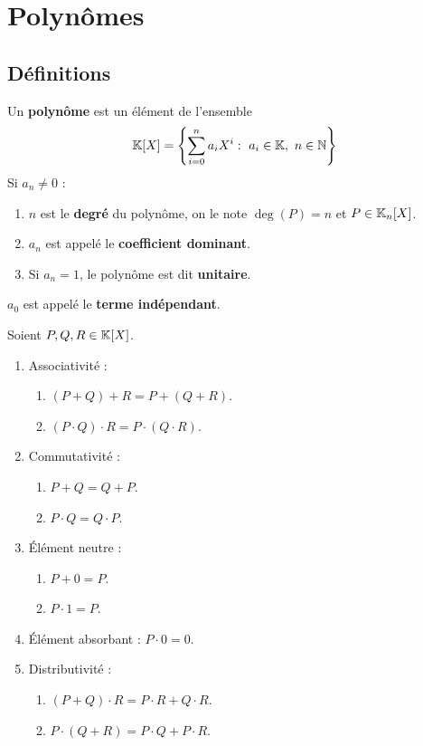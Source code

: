 \chapter{Polynômes}
\def\arraystretch{1}

\section{Définitions}
\begin{definition}[Polynôme]
    Un \textbf{polynôme} est un élément de l'ensemble 
    \begin{align*}
        \mathbb{K}[X] = \left\{ \sum_{i=0}^n a_i X^i : \ a_i \in \mathbb{K},\ n \in \mathbb{N} \right\}
    \end{align*}
    Si $a_n \neq 0$ :
    \begin{enumerate}
    	\item $n$ est le \textbf{degré} du polynôme, on le note $ \deg(P) = n$ et $P \in \mathbb{K}_n[X]$. 
    	\item $a_n$ est appelé le \textbf{coefficient dominant}.
    	\item Si $a_n = 1$, le polynôme est dit \textbf{unitaire}.
    \end{enumerate}
  	$a_0$ est appelé le \textbf{terme indépendant}.
\end{definition}

\begin{proposition}
	Soient $P, Q, R \in \mathbb{K}[X]$.
	\begin{enumerate}
		\item Associativité :
		\begin{enumerate}
			\item $(P + Q) + R = P + (Q + R)$.
			\item $(P \cdot Q) \cdot R = P \cdot (Q \cdot R)$.
		\end{enumerate}
		\item Commutativité :
		\begin{enumerate}
			\item $P + Q = Q + P$.
			\item $P \cdot Q = Q \cdot P$.
		\end{enumerate}
		\item \'Elément neutre :
		\begin{enumerate}
			\item $P + 0 = P$.
			\item $P \cdot 1 = P$.
		\end{enumerate}
		\item \'Elément absorbant : $P \cdot 0 = 0$.
		\item Distributivité :
		\begin{enumerate}
			\item $(P + Q) \cdot R = P \cdot R + Q \cdot R$.
			\item $P \cdot (Q + R) = P \cdot Q + P \cdot R$.
		\end{enumerate}
	\end{enumerate}
\end{proposition}

